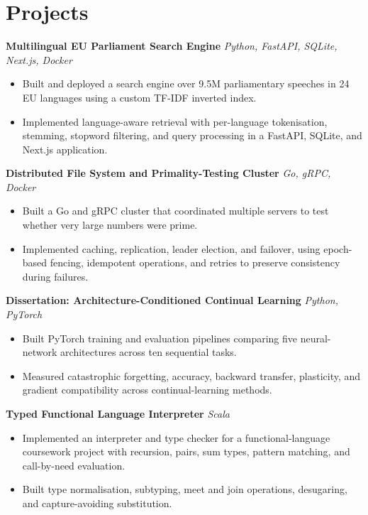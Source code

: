 \documentclass[a4paper,10pt]{article}
\begin{document}
\section*{Projects}
\textbf{Multilingual EU Parliament Search Engine} \hfill \textit{Python, FastAPI, SQLite, Next.js, Docker}
\begin{itemize}
  \item Built and deployed a search engine over 9.5M parliamentary speeches in 24 EU languages using a custom TF-IDF inverted index.
  \item Implemented language-aware retrieval with per-language tokenisation, stemming, stopword filtering, and query processing in a FastAPI, SQLite, and Next.js application.
\end{itemize}

\textbf{Distributed File System and Primality-Testing Cluster} \hfill \textit{Go, gRPC, Docker}
\begin{itemize}
  \item Built a Go and gRPC cluster that coordinated multiple servers to test whether very large numbers were prime.
  \item Implemented caching, replication, leader election, and failover, using epoch-based fencing, idempotent operations, and retries to preserve consistency during failures.
\end{itemize}

\textbf{Dissertation: Architecture-Conditioned Continual Learning} \hfill \textit{Python, PyTorch}
\begin{itemize}
  \item Built PyTorch training and evaluation pipelines comparing five neural-network architectures across ten sequential tasks.
  \item Measured catastrophic forgetting, accuracy, backward transfer, plasticity, and gradient compatibility across continual-learning methods.
\end{itemize}

\textbf{Typed Functional Language Interpreter} \hfill \textit{Scala}
\begin{itemize}
  \item Implemented an interpreter and type checker for a functional-language coursework project with recursion, pairs, sum types, pattern matching, and call-by-need evaluation.
  \item Built type normalisation, subtyping, meet and join operations, desugaring, and capture-avoiding substitution.
\end{itemize}
\end{document}
